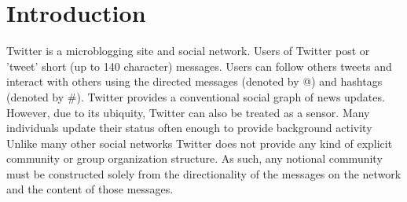 \section{Introduction}
Twitter is a microblogging site and social network.  Users of Twitter post or 'tweet' short (up to 140 character) messages.  Users can follow others tweets and interact with others using the directed messages (denoted by @) and hashtags (denoted by \#). Twitter provides a conventional social graph of news updates.  However, due to its ubiquity, Twitter can also be treated as a sensor.  Many individuals update their status often enough to provide background activity\\
Unlike many other social networks Twitter does not provide any kind of explicit community or group organization structure.  As such, any notional community must be constructed solely from the directionality of the messages on the network and the content of those messages.